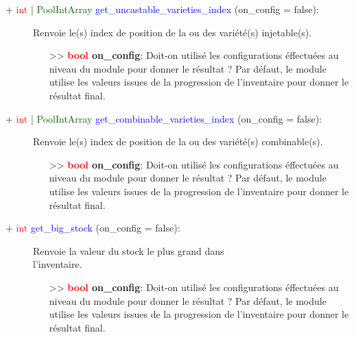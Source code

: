 \documentclass[a4paper, 11pt]{article}
\begin{document}
	\begin{description}
		\item [+ \textcolor{red}{int} | \textcolor{darkgreen}{PoolIntArray} \textcolor{blue}
		{get\_uncastable\_varieties\_index} (on\_config = false):] Renvoie le(s) index de position de la ou 
		des variété(s) injetable(s).
		\begin{itemize}
			\item[>> \textbf{\textcolor{red}{bool} on\_config}:] Doit-on utilisé les configurations 
			éffectuées au niveau du module pour donner le résultat ? Par défaut, le module utilise les 
			valeurs issues de la progression de l'inventaire pour donner le résultat final.\\
		\end{itemize}
	\end{description}
	\begin{description}
		\item [+ \textcolor{red}{int} | \textcolor{darkgreen}{PoolIntArray} \textcolor{blue}
		{get\_combinable\_varieties\_index} (on\_config = false):] Renvoie le(s) index de position de la ou 
		des variété(s) combinable(s).
		\begin{itemize}
			\item[>> \textbf{\textcolor{red}{bool} on\_config}:] Doit-on utilisé les configurations 
			éffectuées au niveau du module pour donner le résultat ? Par défaut, le module utilise les 
			valeurs issues de la progression de l'inventaire pour donner le résultat final.\\
		\end{itemize}
	\end{description}
	\begin{description}
		\item [+ \textcolor{red}{int} \textcolor{blue}{get\_big\_stock} (on\_config = false):] Renvoie la 
		valeur du stock le plus grand dans \\l'inventaire.
		\begin{itemize}
			\item[>> \textbf{\textcolor{red}{bool} on\_config}:] Doit-on utilisé les configurations 
			éffectuées au niveau du module pour donner le résultat ? Par défaut, le module utilise les 
			valeurs issues de la progression de l'inventaire pour donner le résultat final.\\
		\end{itemize}
	\end{description}
\end{document}
